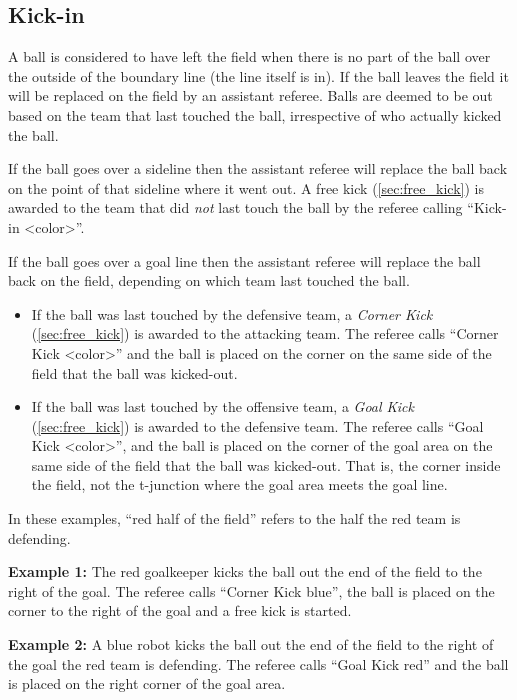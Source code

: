 \subsection{Kick-in}
\label{sec:kick_in}

A ball is considered to have left the field when there is no part of the ball over the outside of the boundary line (\ie the line itself is in). If the ball leaves the field it will be replaced on the field by an assistant referee. Balls are deemed to be out based on the team that last touched the ball, irrespective of who actually kicked the ball.

If the ball goes over a sideline then the assistant referee will replace the ball back on the point of that sideline where it went out. A free kick (\cf \cref{sec:free_kick}) is awarded to the team that did \emph{not} last touch the ball by the referee calling ``Kick-in \textless color\textgreater''.

If the ball goes over a goal line then the assistant referee will replace the ball back on the field, depending on which team last touched the ball.

\begin{itemize}
  \item If the ball was last touched by the defensive team, a \emph{Corner Kick} (\cf \cref{sec:free_kick}) is awarded to the attacking team. The referee calls ``Corner Kick \textless color\textgreater'' and the ball is placed on the corner on the same side of the field that the ball was kicked-out.
  \item If the ball was last touched by the offensive team, a \emph{Goal Kick} (\cf \cref{sec:free_kick}) is awarded to the defensive team. The referee calls ``Goal Kick \textless color\textgreater'', and the ball is placed on the corner of the goal area on the same side of the field that the ball was kicked-out. That is, the corner inside the field, not the t-junction where the goal area meets the goal line.
\end{itemize}

In these examples, ``red half of the field'' refers to the half the red team is defending.

  \textbf{Example 1:} The red goalkeeper kicks the ball out the end of the field to the right of the goal. The referee calls ``Corner Kick blue'', the ball is placed on the corner to the right of the goal and a free kick is started.

  \textbf{Example 2:} A blue robot kicks the ball out the end of the field to the right of the goal the red team is defending. The referee calls ``Goal Kick red'' and the ball is placed on the right corner of the goal area.

